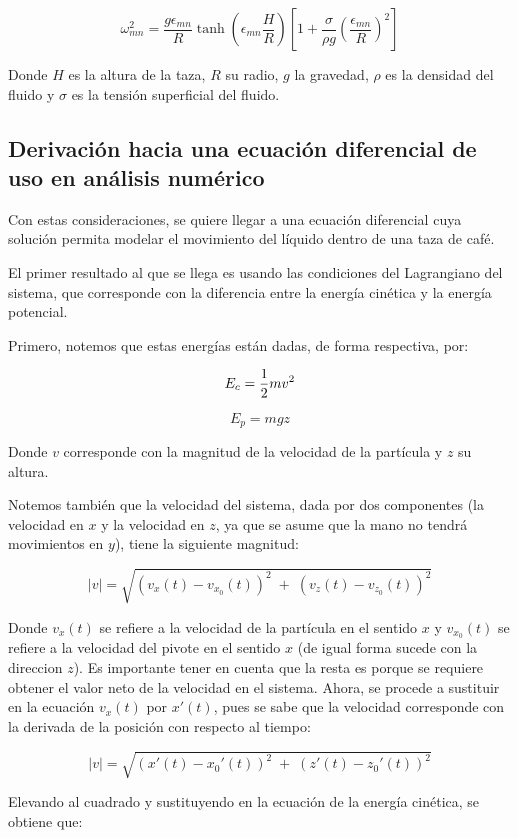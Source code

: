 \documentclass{article}
\begin{document}
$$
\omega_{mn}^{2} = \frac{g \epsilon_{mn}}{R} \tanh \left( \epsilon_{mn} \frac{H}{R} \right) \left[ 1 + \frac{\sigma}{\rho g} \left( \frac{\epsilon_{mn}}{R} \right)^2 \right]
$$

Donde $H$ es la altura de la taza, $R$ su radio, $g $ la gravedad, $\rho$ es la densidad del fluido y $\sigma$ es la tensión superficial del fluido.

\subsection{Derivación hacia una ecuación diferencial de uso en análisis numérico}

Con estas consideraciones, se quiere llegar a una ecuación diferencial cuya solución permita modelar el movimiento del líquido dentro de una taza de café. 

El primer resultado al que se llega es usando las condiciones del Lagrangiano del sistema, que corresponde con la diferencia entre la energía cinética y la energía potencial.

Primero, notemos que estas energías están dadas, de forma respectiva, por: 

$$
E_c = \frac{1}{2}mv^2 \\
$$

$$
E_p = mgz
$$

Donde $v$ corresponde con la magnitud de la velocidad de la partícula y $z$ su altura.

Notemos también que la velocidad del sistema, dada por dos componentes (la velocidad en $x$ y la velocidad en $z$, ya que se asume que la mano no tendrá movimientos en $y$), tiene la siguiente magnitud:

$$ |v| = \sqrt{(v_x(t) - v_{x_0}(t))^2  \; + \; (v_z(t) - v_{z_0}(t))^2}$$

Donde $v_x(t)$ se refiere a la velocidad de la partícula en el sentido $x$ y $v_{x_0}(t)$ se refiere a la velocidad del pivote en el sentido $x$ (de igual forma sucede con la direccion $z$). Es importante tener en cuenta que la resta es porque se requiere obtener el valor neto de la velocidad en el sistema. Ahora, se procede a sustituir en la ecuación $v_x(t)$ por $x'(t)$, pues se sabe que la velocidad corresponde con la derivada de la posición con respecto al tiempo:

$$ |v| = \sqrt{(x'(t) - x_0'(t))^2  \; + \; (z'(t) - z_0'(t))^2}$$

Elevando al cuadrado y sustituyendo en la ecuación de la energía cinética, se obtiene que:
\end{document}
